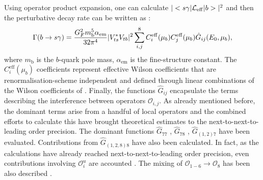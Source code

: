 Using operator product expansion, one can calculate $|<s\gamma|\mathcal{L}_{\mathrm{eff}}|b>|^2$ and then the perturbative decay rate can be written as \cite{Misiak:2020vlo}:
\begin{equation}\label{eq:theory_decay_rate}
    \Gamma(b\rightarrow s\gamma) = \frac{G^2_F m_{\mathrm{b}}^5 \alpha_{\mathrm{em}}}{32\pi^4}|V_{ts}^*V_{tb}|^2\sum_{i,j}^8C^{\mathrm{eff}}_{i}(\mu_b)C^{\mathrm{eff}}_{j}(\mu_b)\hat{G}_{ij}(E_0,\mu_b),
\end{equation}
where $m_{\mathrm{b}}$ is the $b$-quark pole mass, $\alpha_{\mathrm{em}}$ is the fine-structure constant.
The $C_{i}^{\mathrm{eff}}(\mu_b)$ coefficients represent effective Wilson coefficients \cite{Buras:1993xp} that are renormalisation-scheme independent and defined through linear combinations of the Wilson coefficients of .
Finally, the functions $\hat{G}_{ij}$ encapsulate the terms describing the interference between operators $\mathcal{O}_{i,j}$.
As already mentioned before, the dominant terms arise from a handful of local operators and the combined efforts to calculate this have brought \BtoXsgamma theoretical estimates to the next-to-next-to-leading order precision.
The dominant functions $\hat{G}_{77}$ \cite{Asatrian:2006rq}, $\hat{G}_{78}$ \cite{Asatrian:2010rq}, $\hat{G}_{(1,2)7}$ \cite{Boughezal:2007ny,Misiak:2020vlo} have been evaluated.
Contributions from $\hat{G}_{(1,2,8)8}$ \cite{Ferroglia:2010xe,Misiak:2010tk} have also been calculated.
In fact, as the calculations have already reached next-to-next-to-leading order precision, even contributions involving $\mathcal{O}_{i}^u$ are accounted \cite{Huber:2014nna}.
The mixing of $\mathcal{O}_{1-6}\to\mathcal{O}_8$ has been also described \cite{Czakon:2006ss}. 

